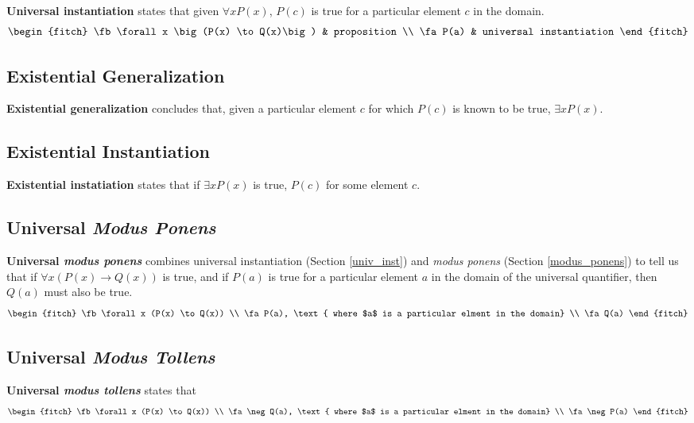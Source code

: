 \textbf{Universal instantiation}  states that given $\forall x P(x)$, $P(c)$ is
true for a particular element $c$ in the domain.
\begin{equation}
  \begin{fitch}
    \fb \forall x \big(P(x) \to Q(x)\big) & proposition \\
    \fa P(a) & universal instantiation
  \end{fitch}
  \label{eq:univ_inst}
\end{equation}

\subsection{Existential Generalization}

\textbf{Existential generalization} concludes
that, given a particular element $c$ for which $P(c)$ is known to be true, $\exists x P(x)$.

\subsection{Existential Instantiation}

\textbf{Existential instatiation} states that if
$\exists x P(x)$ is true, $P(c)$ for some element $c$.

\subsection{Universal \emph{Modus Ponens}}

\textbf{Universal \emph{modus ponens}} combines universal instantiation
(Section \ref{univ_inst}) and \emph{modus ponens} (Section \ref{modus_ponens}) to
tell us that if $\forall x (P(x) \to Q(x) )$ is true, and if $P(a)$ is true for a
particular element $a$ in the domain of the universal quantifier, then $Q(a)$ must
also be true.
\begin{equation}
  \begin{fitch}
    \fb \forall x (P(x) \to Q(x)) \\
    \fa P(a), \text{ where $a$ is a particular elment in the domain} \\
    \fa Q(a)
  \end{fitch}
  \label{eq:univ_mod_pon}
\end{equation}

\subsection{Universal \emph{Modus Tollens}}

\textbf{Universal \emph{modus tollens}} states that
\begin{equation}
  \begin{fitch}
    \fb \forall x (P(x) \to Q(x)) \\
    \fa \neg Q(a), \text{ where $a$ is a particular elment in the domain} \\
    \fa \neg P(a)
  \end{fitch}
  \label{eq:univ_mod_tol}
\end{equation}

